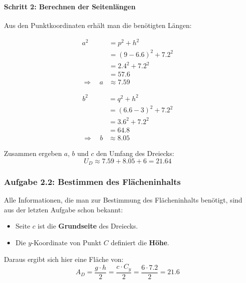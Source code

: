 \documentclass
[
  fontsize = 10pt,
  compress = true,
  ngerman,
  dvipsnames
]
{beamer}
\begin{document}
\begin{frame}
  \frametitle{\sectiontitle}
  \framesubtitle{Schritt 2: Berechnen der Seitenlängen}
  Aus den Punktkoordinaten erhält man die benötigten Längen:
  \begin{minipage}{0.49\linewidth}
    \begin{equation*}
      \begin{split}
        a^2&=p^2+h^2 \\
           &=(9-\num{6.6})^2+\num{7.2}^2 \\
           &=\num{2.4}^2+\num{7.2}^2 \\
           &=\num{57.6} \\
        \Rightarrow\quad a&\approx\num{7.59}
      \end{split}
    \end{equation*}
  \end{minipage}
  \hfill
  \begin{minipage}{0.49\linewidth}
    \begin{equation*}
      \begin{split}
        b^2&=q^2+h^2 \\
           &=(\num{6.6}-3)^2+\num{7.2}^2 \\
           &=\num{3.6}^2+\num{7.2}^2 \\
           &=\num{64.8} \\
        \Rightarrow\quad b&\approx\num{8.05}
      \end{split}
    \end{equation*}
  \end{minipage}
  \bigskip

  \pause

  Zusammen ergeben $a$, $b$ und $c$ den Umfang des Dreiecks:
  \begin{equation*}
    U_D\approx\num{7.59}+\num{8.05}+6=\num{21.64}
  \end{equation*}
\end{frame}

\renewcommand{\sectiontitle}{Aufgabe 2.2: Bestimmen des Flächeninhalts}

\begin{frame}
  \frametitle{\sectiontitle}
  Alle Informationen, die man zur Bestimmung des Flächeninhalts benötigt,
  sind aus der letzten Aufgabe schon bekannt:
  \begin{itemize}
    \item Seite $c$ ist die \textbf{Grundseite} des Dreiecks.
    \item Die $y$-Koordinate von Punkt $C$ definiert die \textbf{Höhe}.
  \end{itemize}
  \bigskip

  \pause

  Daraus ergibt sich hier eine Fläche von:
  \begin{equation*}
    A_D=\frac{g\cdot h}{2}=\frac{c\cdot C_y}{2}=\frac{6\cdot\num{7.2}}{2}=\num{21.6}
  \end{equation*}
\end{frame}
\end{document}
